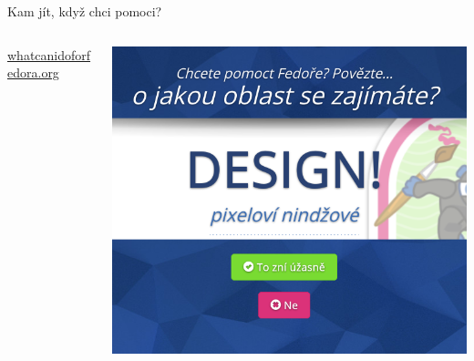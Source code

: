 \documentclass[11pt]{beamer}
\begin{document}
\begin{frame}{Kam jít, když chci pomoci?}
		\begin{columns}[T]
		\begin{column}{0.5\textwidth}
			\url{whatcanidoforfedora.org}
		\end{column}
		\begin{column}{0.5\textwidth}
			\includegraphics[width=\textwidth]{images/fedora.png}
		\end{column}
	\end{columns}	
\end{frame}
\end{document}
